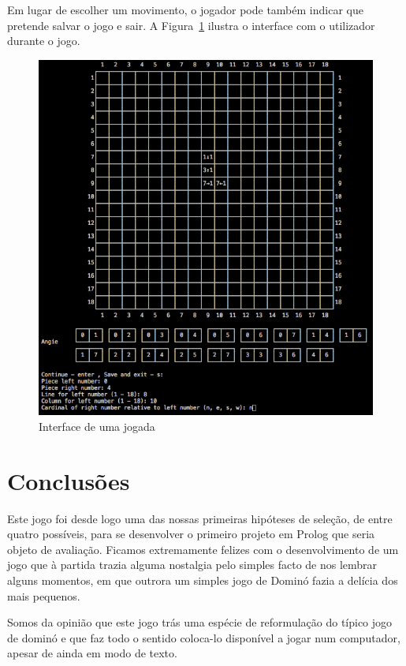 \documentclass[a4paper]{article}
\begin{document}
Em lugar de escolher um movimento, o jogador pode também indicar que pretende salvar o jogo e sair. A Figura~\ref{input_mid} ilustra o interface com o utilizador durante o jogo.

\begin{figure}[htbp]
\begin{center}
\includegraphics[scale=0.6]{input_mid.jpg}
\caption{Interface de uma jogada}
\label{input_mid}
\end{center}
\end{figure}


\section{Conclusões}

Este jogo foi desde logo uma das nossas primeiras hipóteses de seleção, de entre quatro possíveis, para se desenvolver o primeiro projeto em Prolog que seria objeto de avaliação. Ficamos extremamente felizes com o desenvolvimento de um jogo que à partida trazia alguma nostalgia pelo simples facto de nos lembrar alguns momentos, em que outrora um simples jogo de Dominó fazia a delícia dos mais pequenos. 

Somos da opinião que este jogo trás uma espécie de reformulação do típico jogo de dominó e que faz todo o sentido coloca-lo disponível a jogar num computador, apesar de ainda em modo de texto.
\end{document}
